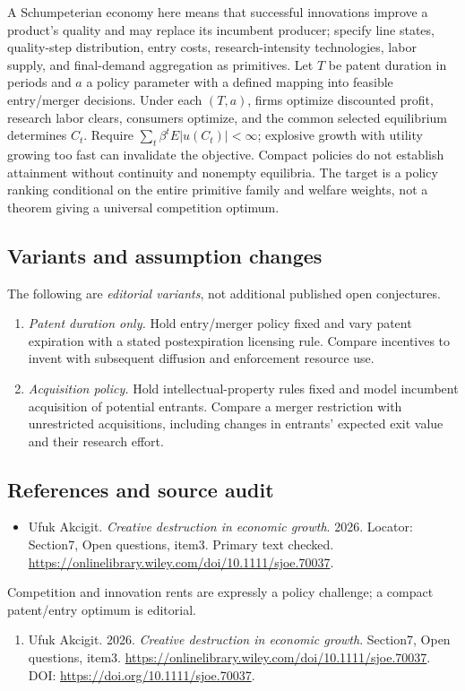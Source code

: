 \documentclass[11pt,a4paper]{article}
\begin{document}
A Schumpeterian economy here means that successful innovations improve a product's quality and may replace its incumbent producer; specify line states, quality-step distribution, entry costs, research-intensity technologies, labor supply, and final-demand aggregation as primitives. Let \(T\) be patent duration in periods and \(a\) a policy parameter with a defined mapping into feasible entry/merger decisions. Under each \((T,a)\), firms optimize discounted profit, research labor clears, consumers optimize, and the common selected equilibrium determines \(C_t\). Require \(\sum_t\beta^tE|u(C_t)|<\infty\); explosive growth with utility growing too fast can invalidate the objective. Compact policies do not establish attainment without continuity and nonempty equilibria. The target is a policy ranking conditional on the entire primitive family and welfare weights, not a theorem giving a universal competition optimum.
\subsection*{Variants and assumption changes}
The following are \emph{editorial variants}, not additional published open conjectures.
\begin{enumerate}
\item \emph{Patent duration only.} Hold entry/merger policy fixed and vary patent expiration with a stated postexpiration licensing rule. Compare incentives to invent with subsequent diffusion and enforcement resource use.
\item \emph{Acquisition policy.} Hold intellectual-property rules fixed and model incumbent acquisition of potential entrants. Compare a merger restriction with unrestricted acquisitions, including changes in entrants' expected exit value and their research effort.
\end{enumerate}
\subsection*{References and source audit}
\begin{itemize}
\item Ufuk Akcigit. \emph{Creative destruction in economic growth}. 2026. Locator: Section7, Open questions, item3. Primary text checked. \url{https://onlinelibrary.wiley.com/doi/10.1111/sjoe.70037}.
\end{itemize}
Competition and innovation rents are expressly a policy challenge; a compact patent/entry optimum is editorial.
\begin{enumerate}\raggedright
\item\hypertarget{definitions:source:30007549:1}{} Ufuk Akcigit. 2026. \emph{Creative destruction in economic growth}. Section7, Open questions, item3.
\url{https://onlinelibrary.wiley.com/doi/10.1111/sjoe.70037}.
DOI: \url{https://doi.org/10.1111/sjoe.70037}.
\end{enumerate}
\end{document}
